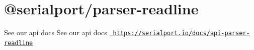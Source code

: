 \chapter{@serialport/parser-\/readline}
\hypertarget{md_Dashboard_2node__modules_2_0dserialport_2bindings-cpp_2node__modules_2_0dserialport_2parser-readline_2README}{}\label{md_Dashboard_2node__modules_2_0dserialport_2bindings-cpp_2node__modules_2_0dserialport_2parser-readline_2README}
\label{md_Dashboard_2node__modules_2_0dserialport_2bindings-cpp_2node__modules_2_0dserialport_2parser-readline_2README_autotoc_md34}%
%
 See our api docs See our api docs \href{https://serialport.io/docs/api-parser-readline}{\texttt{ https\+://serialport.\+io/docs/api-\/parser-\/readline}} 